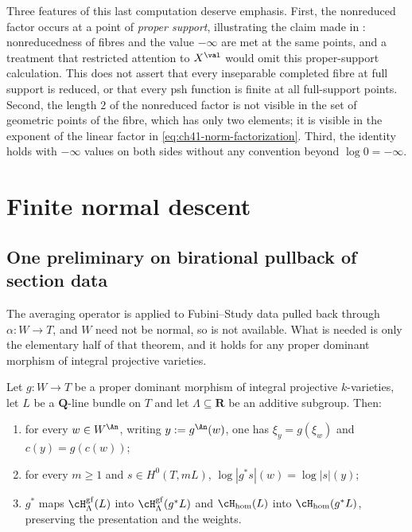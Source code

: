 \begin{example}
Three features of this last computation deserve emphasis.  First, the
nonreduced factor occurs at a point of \emph{proper support}, illustrating
the claim made in : nonreducedness of fibres and the
value $-\infty$ are met at the same points, and a treatment that
restricted attention to $X^{\val}$ would omit this proper-support
calculation.  This does not assert that every inseparable completed
fibre at full support is reduced, or that every psh function is finite
at all full-support points.  Second, the length $2$ of the nonreduced
factor is not visible in the set of geometric points of the fibre, which has
only two elements; it is visible in the exponent of the linear factor in
\eqref{eq:ch41-norm-factorization}.  Third, the identity holds with
$-\infty$ values on both sides without any convention beyond
$\log0=-\infty$.
\end{example}

\section{Finite normal descent}
\label{sec:ch41-descent}

\subsection{One preliminary on birational pullback of section data}
\label{sec:ch41-birational-gf}

The averaging operator is applied to Fubini--Study data pulled back through
$\alpha:W\to T$, and $W$ need not be normal, so
 is not available.  What is needed is only the
elementary half of that theorem, and it holds for any proper dominant
morphism of integral projective varieties.

\begin{lemma}
\label{lem:ch41-proper-gf-pullback}
Let $g:W\to T$ be a proper dominant morphism of integral projective
$k$-varieties, let $L$ be a $\mathbf Q$-line bundle on $T$ and let
$\Lambda\subseteq\mathbf R$ be an additive subgroup.  Then:
\begin{enumerate}
\item\label{itm:ch41-pgf:centre}
      for every $w\in W^{\An}$, writing $y:=g^{\An}(w)$, one has
      $\xi_y=g(\xi_w)$ and $c(y)=g(c(w))$;
\item\label{itm:ch41-pgf:values}
      for every $m\ge1$ and $s\in H^0(T,mL)$,
      $\log|g^*s|(w)=\log|s|(y)$;
\item\label{itm:ch41-pgf:fs}
      $g^*$ maps $\cH^{\mathrm{gf}}_\Lambda(L)$ into
      $\cH^{\mathrm{gf}}_\Lambda(g^*L)$ and
      $\cH_{\mathrm{hom}}(L)$ into $\cH_{\mathrm{hom}}(g^*L)$,
      preserving the presentation and the weights.
\end{enumerate}
\end{lemma}

